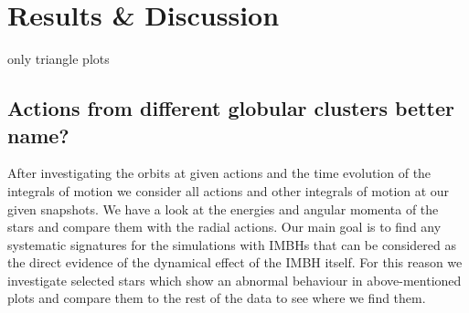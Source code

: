 \section{Results \& Discussion}
only triangle plots

\subsection{Actions from different globular clusters\color{red} better name? \color{black}}
After investigating the orbits at given actions and the time evolution of the integrals of motion we consider all actions and other integrals of motion at our given snapshots. We have a look at the energies and angular momenta of the stars and compare them with the radial actions. Our main goal is to find any systematic signatures for the simulations with \acp{IMBH} that can be considered as the direct evidence of the dynamical effect of the \ac{IMBH} itself. For this reason we investigate selected stars which show an abnormal behaviour in above-mentioned plots and compare them to the rest of the data to see where we find them.

